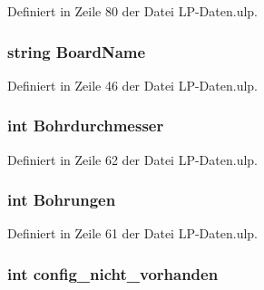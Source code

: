 Definiert in Zeile 80 der Datei L\+P-\/\+Daten.\+ulp.

\hypertarget{_l_p-_daten_8ulp_ae174b40cb33b09a863149fee067990ee}{}
\subsubsection[{Board\+Name}]{\setlength{\rightskip}{0pt plus 5cm}string Board\+Name}\label{_l_p-_daten_8ulp_ae174b40cb33b09a863149fee067990ee}


Definiert in Zeile 46 der Datei L\+P-\/\+Daten.\+ulp.

\hypertarget{_l_p-_daten_8ulp_a335506fe28ba5c545c5bc50350dae9bb}{}
\subsubsection[{Bohrdurchmesser}]{\setlength{\rightskip}{0pt plus 5cm}int Bohrdurchmesser}\label{_l_p-_daten_8ulp_a335506fe28ba5c545c5bc50350dae9bb}


Definiert in Zeile 62 der Datei L\+P-\/\+Daten.\+ulp.

\hypertarget{_l_p-_daten_8ulp_aa00dd541f257a5406d5af13d12aeddaf}{}
\subsubsection[{Bohrungen}]{\setlength{\rightskip}{0pt plus 5cm}int Bohrungen}\label{_l_p-_daten_8ulp_aa00dd541f257a5406d5af13d12aeddaf}


Definiert in Zeile 61 der Datei L\+P-\/\+Daten.\+ulp.

\hypertarget{_l_p-_daten_8ulp_a45e22d9db317238127f2a1d385e17c1c}{}
\subsubsection[{config\+\_\+nicht\+\_\+vorhanden}]{\setlength{\rightskip}{0pt plus 5cm}int config\+\_\+nicht\+\_\+vorhanden}\label{_l_p-_daten_8ulp_a45e22d9db317238127f2a1d385e17c1c}


